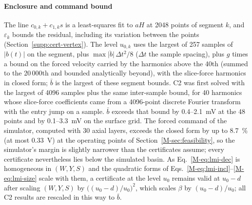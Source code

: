 \paragraph{Enclosure and command bound}
The line $c_{0,k}+c_{1,k}s$ is a least-squares fit to $aH$ at 2048 points of segment $k$, and $\varepsilon_k$ bounds the residual, including its variation between the points (Section~\ref{supp:cert-vertex}). The level $u_{0,k}$ uses the largest of 257 samples of $\lvert b(t)\rvert$ on the segment, plus $\max\lvert\ddot b\rvert\,\Delta t^2/8$ ($\Delta t$ the sample spacing), plus $g$ times a bound on the forced velocity carried by the harmonics above the 40th (summed to the 20\,000th and bounded analytically beyond), with the slice-force harmonics in closed form; $\bar b$ is the largest of these segment bounds. C2 was first solved with the largest of 4096 samples plus the same inter-sample bound, for 40 harmonics whose slice-force coefficients came from a 4096-point discrete Fourier transform with the entry jump on a sample. $\bar b$ exceeds that bound by 0.4--\SI{2.1}{\milli\volt} at the 48 points and by 0.1--\SI{3.3}{\milli\volt} on the surface grid. The forced command of the simulator, computed with 30 axial layers, exceeds the closed form by up to \SI{8.7}{\percent} (at most \SI{0.33}{\volt}) at the operating points of Section~\ref{M-sec:feasibility}, so the simulator's margin is slightly narrower than the certificates assume; every certificate nevertheless lies below the simulated basin. As Eq.~\eqref{M-eq:lmi-dec} is homogeneous in $(W,Y,S)$ and the quadratic forms of Eqs.~\eqref{M-eq:lmi-incl}--\eqref{M-eq:lmi-size} scale with them, a certificate at the level $u_0$ remains valid at $u_0-d$ after scaling $(W,Y,S)$ by $\big((u_0-d)/u_0\big)^2$, which scales $\beta$ by $(u_0-d)/u_0$; all C2 results are rescaled in this way to $\bar b$.

